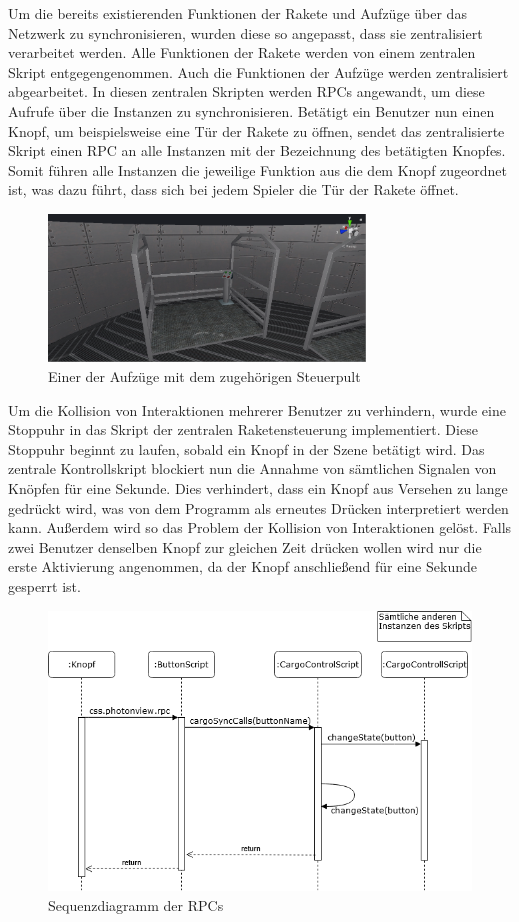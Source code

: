 Um die bereits existierenden Funktionen der Rakete und Aufzüge über das Netzwerk zu synchronisieren, wurden diese so angepasst, dass sie zentralisiert verarbeitet werden. Alle Funktionen der Rakete werden von einem zentralen Skript entgegengenommen. Auch die Funktionen der Aufzüge werden zentralisiert abgearbeitet. In diesen zentralen Skripten werden RPCs angewandt, um diese Aufrufe über die Instanzen zu synchronisieren. Betätigt ein Benutzer nun einen Knopf, um beispielsweise eine Tür der Rakete zu öffnen, sendet das zentralisierte Skript einen RPC an alle Instanzen mit der Bezeichnung des betätigten Knopfes. Somit führen alle Instanzen die jeweilige Funktion aus die dem Knopf zugeordnet ist, was dazu führt, dass sich bei jedem Spieler die Tür der Rakete öffnet.

\begin{figure}[H]
\centering
\includegraphics[width=0.75\textwidth]{Elevator.PNG}
\caption{Einer der Aufzüge mit dem zugehörigen Steuerpult}
\end{figure}

Um die Kollision von Interaktionen mehrerer Benutzer zu verhindern, wurde eine Stoppuhr in das Skript der zentralen Raketensteuerung implementiert. Diese Stoppuhr beginnt zu laufen, sobald ein Knopf in der Szene betätigt wird. Das zentrale Kontrollskript blockiert nun die Annahme von sämtlichen Signalen von Knöpfen für eine Sekunde. Dies verhindert, dass ein Knopf aus Versehen zu lange gedrückt wird, was von dem Programm als erneutes Drücken interpretiert werden kann. Außerdem wird so das Problem der Kollision von Interaktionen gelöst. Falls zwei Benutzer denselben Knopf zur gleichen Zeit drücken wollen wird nur die erste Aktivierung angenommen, da der Knopf anschließend für eine Sekunde gesperrt ist.

\begin{figure}[H]
\centering
\includegraphics[width=1\textwidth]{RPC.PNG}
\caption{Sequenzdiagramm der RPCs}
\end{figure}

